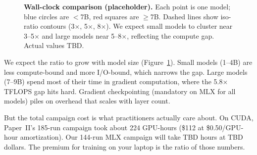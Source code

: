 \documentclass[11pt]{article}
\begin{document}
\begin{figure}[t]
\centering
{}
\caption{\textbf{Wall-clock comparison (placeholder).}  Each point is one model; blue circles are $<$7B, red squares are $\geq$7B.  Dashed lines show iso-ratio contours (3$\times$, 5$\times$, 8$\times$).  We expect small models to cluster near 3--5$\times$ and large models near 5--8$\times$, reflecting the compute gap.  Actual values TBD.}
\label{fig:wall-clock-scatter}
\end{figure}

We expect the ratio to grow with model size (Figure~\ref{fig:wall-clock-scatter}).  Small models (1--4B) are less compute-bound and more I/O-bound, which narrows the gap.  Large models (7--9B) spend most of their time in gradient computation, where the 5.8$\times$ TFLOPS gap hits hard.  Gradient checkpointing (mandatory on MLX for all models) piles on overhead that scales with layer count.

But the total campaign cost is what practitioners actually care about.  On CUDA, Paper~II's 185-run campaign took about 224 GPU-hours (\$112 at \$0.50/GPU-hour amortization).  Our 144-run MLX campaign will take TBD hours at TBD dollars.  The premium for training on your laptop is the ratio of those numbers.
\end{document}
